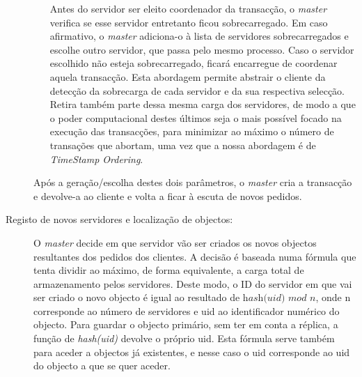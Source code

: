 \begin{description}
\begin{itemize}
Antes do servidor ser eleito coordenador da transacção, o \textit{master} verifica se esse servidor entretanto ficou sobrecarregado. Em caso afirmativo, o \textit{master} adiciona-o à lista de servidores sobrecarregados e escolhe outro servidor, que passa pelo mesmo processo. Caso o servidor escolhido não esteja sobrecarregado, ficará encarregue de coordenar aquela transacção.  Esta abordagem permite abstrair o cliente da detecção da sobrecarga de cada servidor e da sua respectiva selecção. Retira também parte dessa mesma carga dos servidores, de modo a que o poder computacional destes últimos seja o mais possível focado na execução das transacções, para minimizar ao máximo o número de transações que abortam, uma vez que a nossa abordagem é de \textit{TimeStamp Ordering}\cite{ex1}.
\end{itemize}
Após a geração/escolha destes dois parâmetros, o \textit{master} cria a transacção e devolve-a ao cliente e volta a ficar à escuta de novos pedidos.

\item[Registo de novos servidores e localização de objectos:]
O \textit{master} decide em que servidor vão ser criados os novos objectos resultantes dos pedidos dos clientes. A decisão é baseada numa fórmula que tenta dividir ao máximo, de forma equivalente, a carga total de armazenamento pelos servidores. Deste modo, o ID do servidor em que vai ser criado o novo objecto é igual ao resultado de $ \textit{hash(uid) mod n} $, onde n corresponde ao número de servidores e uid ao identificador numérico do objecto. Para guardar o objecto primário, sem ter em conta a réplica, a função de \textit{hash(uid)} devolve o próprio uid. Esta fórmula serve também para aceder a objectos já existentes, e nesse caso o uid corresponde ao uid do objecto a que se quer aceder.


\end{description}
